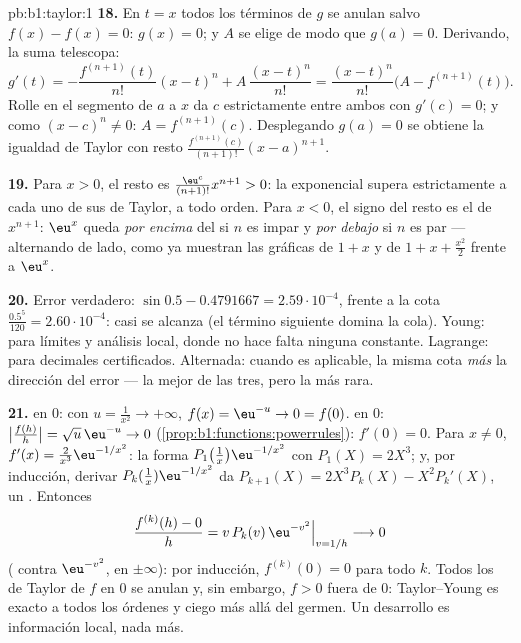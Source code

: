 \begin{solution}{pb:b1:taylor:1}
\textbf{18.} En $t = x$ todos los términos de $g$ se anulan salvo
$f(x) - f(x) = 0$: $g(x) = 0$; y $A$ se elige de modo que
$g(a) = 0$. Derivando, la suma telescopa:
\[
g'(t) = -\frac{f^{(n+1)}(t)}{n!}(x - t)^n +
A\,\frac{(x-t)^n}{n!}
= \frac{(x-t)^n}{n!}\bigl(A - f^{(n+1)}(t)\bigr) .
\]
Rolle en el segmento de $a$ a $x$ da $c$ estrictamente entre ambos
con $g'(c) = 0$; y como $(x - c)^n \neq 0$: $A = f^{(n+1)}(c)$.
Desplegando $g(a) = 0$ se obtiene la igualdad de Taylor con resto
$\frac{f^{(n+1)}(c)}{(n+1)!}(x-a)^{n+1}$.

\textbf{19.} Para $x > 0$, el resto es
$\frac{\eu^{c}} {(n+1)!}x^{n+1} > 0$: la exponencial supera
estrictamente a cada uno de sus  de Taylor, a todo orden.
Para $x < 0$, el signo del resto es el de $x^{n+1}$: $\eu^x$ queda
\emph{por encima} del  si $n$ es impar y \emph{por debajo}
si $n$ es par --- alternando de lado, como ya muestran las gráficas
de $1 + x$ y de $1 + x + \frac{x^2}{2}$ frente a $\eu^x$.

\textbf{20.} Error verdadero:
$\sin 0.5 - 0.4791667 = 2.59\cdot10^{-4}$, frente a la cota
$\frac{0.5^5}{120} = 2.60\cdot10^{-4}$: casi se alcanza (el término
siguiente domina la cola). Young: para límites y análisis local,
donde no hace falta ninguna constante. Lagrange: para decimales
certificados. Alternada: cuando es aplicable, la misma cota
\emph{más} la dirección del error --- la mejor de las tres, pero la
más rara.

\textbf{21.}  en $0$: con
$u = \frac{1}{x^2} \to +\infty$, $f(x) = \eu^{-u} \to 0 = f(0)$.
 en $0$:
$\bigl|\frac{f(h)}{h}\bigr| = \sqrt u\,\eu^{-u} \to 0$
(\cref{prop:b1:functions:powerrules}): $f'(0) = 0$. Para
$x \neq 0$, $f'(x) = \frac{2}{x^3}\eu^{-1/x^2}$: la forma
$P_1\bigl(\frac1x\bigr)\eu^{-1/x^2}$ con $P_1(X) = 2X^3$; y, por
inducción, derivar $P_k(\frac1x)\eu^{-1/x^2}$ da
$P_{k+1}(X) = 2X^3 P_k(X) - X^2 P_k'(X)$, un . Entonces
\[
\frac{f^{(k)}(h) - 0}{h} = v\,P_k(v)\,\eu^{-v^2}
\Big|_{v = 1/h} \longrightarrow 0
\]
( contra $\eu^{-v^2}$,  en
$\pm\infty$): por inducción, $f^{(k)}(0) = 0$ para todo $k$. Todos
los  de Taylor de $f$ en $0$ se anulan y, sin embargo,
$f > 0$ fuera de $0$: Taylor--Young es exacto a todos los órdenes y
ciego más allá del germen. Un desarrollo es información local, nada
más.


\end{solution}
